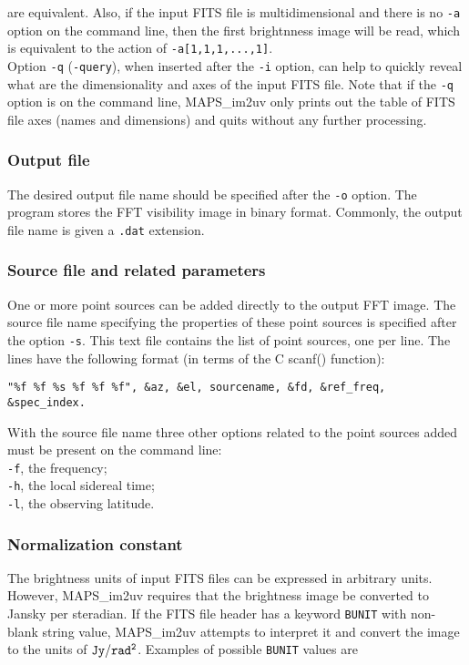 \documentclass[letterpaper, twoside, 12pt]{article}
\begin{document}
are equivalent. Also, if the input FITS file is multidimensional and there is no {\tt -a} option on the command line, then the first brightnness image will be read, which is equivalent to the action of {\tt -a[1,1,1,...,1]}. \\ 

Option {\tt -q} ({\tt -query}), when inserted after the {\tt -i} option,
can help to quickly reveal what are the dimensionality and axes of the input FITS file. Note that if the {\tt -q} option is on the command line,  MAPS\_im2uv only prints out the table of FITS file axes (names and dimensions) and quits without any further processing.

\subsubsection*{Output file}
The desired output file name should be specified after the {\tt -o} option. The program stores the FFT visibility image  in binary format. Commonly, the output file name is given a {\tt .dat} extension.

\subsubsection*{Source file and related parameters}
One or more point sources can be added directly to the output FFT image. The source file name specifying the properties of these point sources 
is specified after the option {\tt-s}. This text file contains the list of point sources, one per line. The lines have the following format (in terms of the C scanf() function):
\begin{verbatim}
"%f %f %s %f %f %f", &az, &el, sourcename, &fd, &ref_freq, &spec_index.
\end{verbatim}
With the source file name three other options related to the point sources added must be present on the command line:\\

{\tt-f}, the frequency; \\
{\tt-h}, the local sidereal time; \\
{\tt-l}, the observing latitude. \\

\subsubsection*{Normalization constant}
The brightness units of input FITS files can be expressed in arbitrary units. However, MAPS\_im2uv requires that the brightness image be converted to Jansky per steradian. If the FITS file header has a keyword {\tt BUNIT} with non-blank string value, MAPS\_im2uv attempts to interpret it and convert the image to the units of ${\tt Jy/rad^2}$. Examples of possible {\tt BUNIT} values are\\
\end{document}
